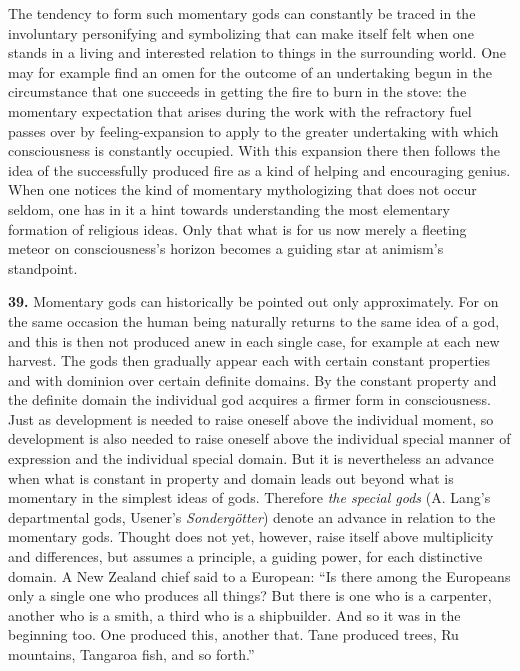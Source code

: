 \documentclass[12pt,a4paper]{book}
\newcommand{\opage}[1]{\marginnote{\footnotesize\textit{[#1]}}}
\begin{document}
The tendency to form such momentary gods can constantly be traced in the involuntary
personifying and symbolizing that can make itself felt when one stands in a living and
interested relation to things in the surrounding world. One may for example find an omen
for the outcome of an undertaking begun in the circumstance that one succeeds in getting
the fire to burn in the stove: the momentary expectation that arises during the work with
the refractory fuel passes over by feeling-expansion to apply to the greater undertaking
with which consciousness is constantly occupied. With this expansion there then follows
the idea of the successfully produced fire as a kind of helping and encouraging genius.
When one notices the kind of momentary mythologizing that does not occur seldom, one has
in it a hint towards understanding the most elementary formation of religious ideas.
Only that what is for us now merely a fleeting meteor on consciousness's horizon becomes a
guiding star at animism's standpoint.

\medskip

\noindent\textbf{39.} Momentary gods can historically be pointed out only approximately.
For on the same occasion the human being naturally returns to the same idea of a god, and
this is then not produced anew in each single case, for example at each new harvest. The
gods then gradually appear each with certain constant properties and with dominion over
certain definite domains. By the constant property and the definite domain the individual
god acquires 
\opage{91}a firmer form in consciousness. Just as development is needed to raise
oneself above the individual moment, so development is also needed to raise oneself above
the individual special manner of expression and the individual special domain. But it is
nevertheless an advance when what is constant in property and domain leads out beyond what
is momentary in the simplest ideas of gods. Therefore \emph{the special gods} (A. Lang's
departmental gods, Usener's \textit{Sondergötter}) denote an advance in relation to the
momentary gods. Thought does not yet, however, raise itself above multiplicity and
differences, but assumes a principle, a guiding power, for each distinctive domain. A New
Zealand chief said to a European: ``Is there among the Europeans only a single one who
produces all things? But there is one who is a carpenter, another who is a smith, a third
who is a shipbuilder. And so it was in the beginning too. One produced this, another that.
Tane produced trees, Ru mountains, Tangaroa fish, and so forth.''
\end{document}
